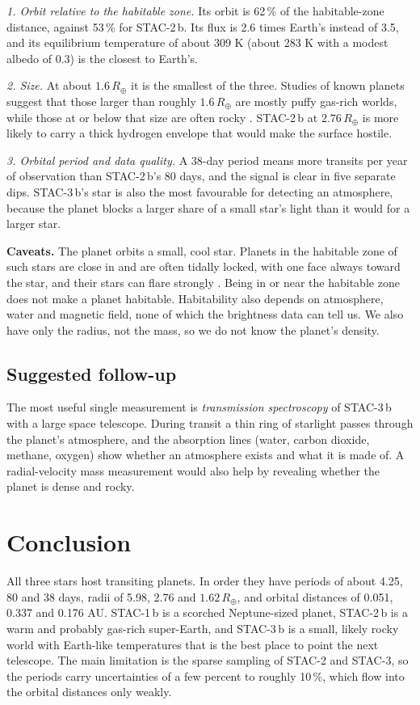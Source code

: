 \documentclass[10pt,twocolumn]{article}
\newcommand{\Rearth}{R_{\oplus}}
\begin{document}
\emph{1. Orbit relative to the habitable zone.} Its orbit is 62\,\% of the habitable-zone distance, against 53\,\% for STAC-2\,b. Its flux is 2.6 times Earth's instead of 3.5, and its equilibrium temperature of about 309 K (about 283 K with a modest albedo of 0.3) is the closest to Earth's.

\emph{2. Size.} At about $1.6\,\Rearth$ it is the smallest of the three. Studies of known planets suggest that those larger than roughly $1.6\,\Rearth$ are mostly puffy gas-rich worlds, while those at or below that size are often rocky \cite{rogers}. STAC-2\,b at $2.76\,\Rearth$ is more likely to carry a thick hydrogen envelope that would make the surface hostile.

\emph{3. Orbital period and data quality.} A 38-day period means more transits per year of observation than STAC-2\,b's 80 days, and the signal is clear in five separate dips. STAC-3\,b's star is also the most favourable for detecting an atmosphere, because the planet blocks a larger share of a small star's light than it would for a larger star.

\textbf{Caveats.} The planet orbits a small, cool star. Planets in the habitable zone of such stars are close in and are often tidally locked, with one face always toward the star, and their stars can flare strongly \cite{shields}. Being in or near the habitable zone does not make a planet habitable. Habitability also depends on atmosphere, water and magnetic field, none of which the brightness data can tell us. We also have only the radius, not the mass, so we do not know the planet's density.

\subsection{Suggested follow-up}
The most useful single measurement is \emph{transmission spectroscopy} of STAC-3\,b with a large space telescope. During transit a thin ring of starlight passes through the planet's atmosphere, and the absorption lines (water, carbon dioxide, methane, oxygen) show whether an atmosphere exists and what it is made of. A radial-velocity mass measurement would also help by revealing whether the planet is dense and rocky.

\section{Conclusion}
All three stars host transiting planets. In order they have periods of about 4.25, 80 and 38 days, radii of 5.98, 2.76 and $1.62\,\Rearth$, and orbital distances of 0.051, 0.337 and 0.176 AU. STAC-1\,b is a scorched Neptune-sized planet, STAC-2\,b is a warm and probably gas-rich super-Earth, and STAC-3\,b is a small, likely rocky world with Earth-like temperatures that is the best place to point the next telescope. The main limitation is the sparse sampling of STAC-2 and STAC-3, so the periods carry uncertainties of a few percent to roughly 10\,\%, which flow into the orbital distances only weakly.
\end{document}
